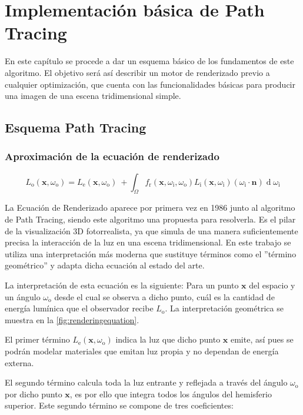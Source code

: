 \chapter{Implementación básica de Path Tracing}
	
En este capítulo se procede a dar un esquema básico de los fundamentos de este algoritmo. El objetivo será así describir un motor de renderizado previo a cualquier optimización, que cuenta con las funcionalidades básicas para producir una imagen de una escena tridimensional simple.


\section{Esquema Path Tracing}
\label{pathtracingexplanation}


	\subsection{Aproximación de la ecuación de renderizado}
\[
{\displaystyle L_{\text{o}}(\mathbf {x} ,\omega _{\text{o}})=L_{\text{e}}(\mathbf {x} ,\omega _{\text{o}})\ +\int _{\Omega }f_{\text{r}}(\mathbf {x} ,\omega _{\text{i}},\omega _{\text{o}})L_{\text{i}}(\mathbf {x} ,\omega _{\text{i}})(\omega _{\text{i}}\cdot \mathbf {n} )\operatorname {d} \omega _{\text{i}}}
\]

La Ecuación de Renderizado \cite{kajiya1986rendering} aparece por primera vez en 1986 junto al algoritmo de Path Tracing, siendo este algoritmo una propuesta para resolverla. Es el pilar de la visualización 3D fotorrealista, ya que simula de una manera suficientemente precisa la interacción de la luz en una escena tridimensional. En este trabajo se utiliza una interpretación más moderna que sustituye términos como el ''término geométrico'' y adapta dicha ecuación al estado del arte.

La interpretación de esta ecuación es la siguiente: Para un punto $\mathbf {x}$ del espacio y un ángulo $\omega _{\text{o}}$ desde el cual se observa a dicho punto, cuál es la cantidad de energía lumínica que el observador recibe $L_{\text{o}}$. La interpretación geométrica se muestra en la \autoref{fig:renderingequation}.

El primer término $L_{\text{e}}(\mathbf {x} ,\omega _{\text{o}})$ indica la luz que dicho punto $\mathbf {x}$ emite, así pues se podrán modelar materiales que emitan luz propia y no dependan de energía externa.

El segundo término calcula toda la luz entrante y reflejada a través del ángulo $\omega _{\text{o}}$ por dicho punto $\mathbf {x}$, es por ello que integra todos los ángulos del hemisferio superior. Este segundo término se compone de tres coeficientes:

